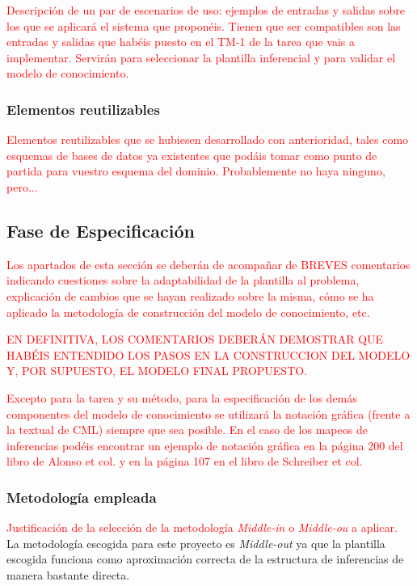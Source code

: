\documentclass[12pt,a4paper,twoside,spanish]{article}      %
\begin{document}
\textcolor {red} {Descripción de un par de escenarios de uso: ejemplos de entradas y salidas sobre los que se aplicará el sistema que proponéis. Tienen que ser compatibles son las entradas y salidas que habéis puesto en el TM-1 de la tarea que vais a implementar. Servirán para seleccionar la plantilla inferencial y para validar el modelo de conocimiento.}

\subsubsection{Elementos reutilizables}

\textcolor {red} {Elementos reutilizables que se hubiesen desarrollado con anterioridad, tales como esquemas de bases de datos ya existentes que podáis tomar como punto de partida para vuestro esquema del dominio. Probablemente no haya ninguno, pero...}


\subsection{Fase de Especificación}

\textcolor {red} {Los apartados de esta sección  se deberán de acompañar de BREVES comentarios indicando cuestiones sobre la adaptabilidad de la plantilla al problema, explicación de cambios que se hayan realizado sobre la misma, cómo se ha aplicado la metodología de construcción del modelo de conocimiento, etc.}

\textcolor {red} {EN DEFINITIVA, LOS COMENTARIOS DEBERÁN DEMOSTRAR QUE HABÉIS ENTENDIDO LOS PASOS EN LA CONSTRUCCION DEL MODELO Y, POR SUPUESTO, EL MODELO FINAL PROPUESTO.}

\textcolor {red} {Excepto para la tarea y su método, para la especificación de los demás componentes del modelo de conocimiento se utilizará la notación gráfica (frente a la textual de CML) siempre que sea posible. En el caso de los mapeos de inferencias podéis encontrar un ejemplo de notación gráfica en la página 200 del libro de Alonso et col. y en la página 107 en el libro de Schreiber et col.}


\subsubsection{Metodología empleada}
\textcolor {red} {Justificación de la selección de la metodología \emph{Middle-in} o \emph{Middle-ou} a aplicar.}
La metodología escogida para este proyecto es \textit{Middle-out} ya que la plantilla escogida funciona como aproximación correcta de la estructura de inferencias de manera bastante directa.
\end{document}
